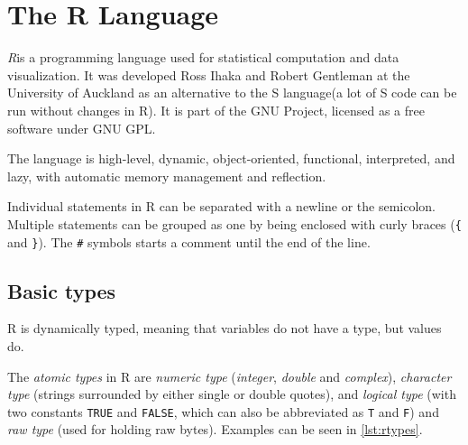 \chapter{The R Language}

\begin{chapterabstract}
  \todoadd
\end{chapterabstract}


\textit{R}\todocite is a programming language used for statistical computation and data visualization. It was developed Ross Ihaka and Robert Gentleman at the University of Auckland as an alternative to the S language\todocite (a lot of S code can be run without changes in R). It is part of the GNU Project, licensed as a free software under GNU GPL.

The language is high-level, dynamic, object-oriented, functional, interpreted, and lazy, with automatic memory management and reflection.

Individual statements in R can be separated with a newline or the semicolon. Multiple statements can be grouped as one by being enclosed with curly braces (\texttt{\{} and \texttt{\}}). The \texttt{\#} symbols starts a comment until the end of the line.

\section{Basic types}

R is dynamically typed, meaning that variables do not have a type, but values do.

The \textit{atomic types} in R are \textit{numeric type} (\textit{integer}, \textit{double} and \textit{complex}), \textit{character type} (strings surrounded by either single or double quotes), and \textit{logical type} (with two constants \texttt{TRUE} and \texttt{FALSE}, which can also be abbreviated as \texttt{T} and \texttt{F}) and \textit{raw type} (used for holding raw bytes). Examples can be seen in \ref{lst:rtypes}.

